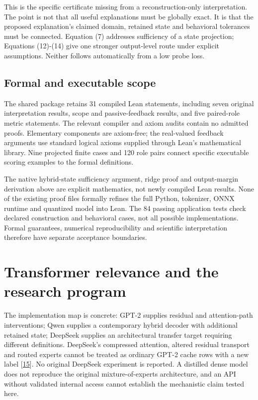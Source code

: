 \documentclass[11pt,letterpaper]{article}
\begin{document}
This is the specific certificate missing from a reconstruction-only interpretation. The point is not that all useful explanations must be globally exact. It is that the proposed explanation's claimed domain, retained state and behavioral tolerances must be connected. Equation (7) addresses sufficiency of a state projection; Equations (12)-(14) give one stronger output-level route under explicit assumptions. Neither follows automatically from a low probe loss.

\subsection{Formal and executable scope}

The shared package retains 31 compiled Lean statements, including seven original interpretation results, scope and passive-feedback results, and five paired-role metric statements. The relevant compiler and axiom audits contain no admitted proofs. Elementary components are axiom-free; the real-valued feedback arguments use standard logical axioms supplied through Lean's mathematical library. Nine projected finite cases and 120 role pairs connect specific executable scoring examples to the formal definitions.

The native hybrid-state sufficiency argument, ridge proof and output-margin derivation above are explicit mathematics, not newly compiled Lean results. None of the existing proof files formally refines the full Python, tokenizer, ONNX runtime and quantized model into Lean. The 84 passing application tests check declared construction and behavioral cases, not all possible implementations. Formal guarantees, numerical reproducibility and scientific interpretation therefore have separate acceptance boundaries.

\section{Transformer relevance and the research program}

The implementation map is concrete: GPT-2 supplies residual and attention-path interventions; Qwen supplies a contemporary hybrid decoder with additional retained state; DeepSeek supplies an architectural transfer target requiring different definitions. DeepSeek's compressed attention, altered residual transport and routed experts cannot be treated as ordinary GPT-2 cache rows with a new label [\hyperref[ref:15]{15}]. No original DeepSeek experiment is reported. A distilled dense model does not reproduce the original mixture-of-experts architecture, and an API without validated internal access cannot establish the mechanistic claim tested here.
\end{document}
